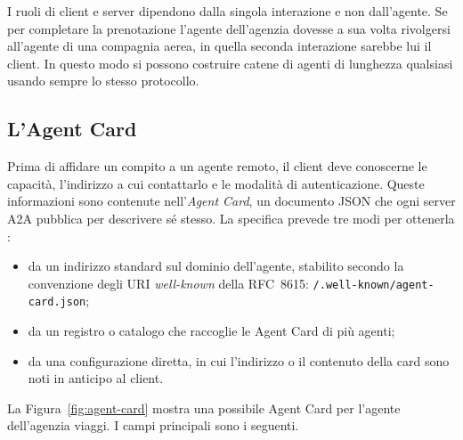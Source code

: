 I ruoli di client e server dipendono dalla singola interazione e non dall'agente. Se per completare la prenotazione l'agente dell'agenzia dovesse a sua volta rivolgersi all'agente di una compagnia aerea, in quella seconda interazione sarebbe lui il client. In questo modo si possono costruire catene di agenti di lunghezza qualsiasi usando sempre lo stesso protocollo.

\subsection{L'Agent Card}

Prima di affidare un compito a un agente remoto, il client deve conoscerne le capacità, l'indirizzo a cui contattarlo e le modalità di autenticazione. Queste informazioni sono contenute nell'\emph{Agent Card}, un documento JSON che ogni server A2A pubblica per descrivere sé stesso. La specifica prevede tre modi per ottenerla \cite{a2aspec}:

\begin{itemize}
    \item da un indirizzo standard sul dominio dell'agente, stabilito secondo la convenzione degli URI \emph{well-known} della RFC~8615: \texttt{/.well-known/\allowbreak agent-card.json};
    \item da un registro o catalogo che raccoglie le Agent Card di più agenti;
    \item da una configurazione diretta, in cui l'indirizzo o il contenuto della card sono noti in anticipo al client.
\end{itemize}

La Figura~\ref{fig:agent-card} mostra una possibile Agent Card per l'agente dell'agenzia viaggi. I campi principali sono i seguenti.

